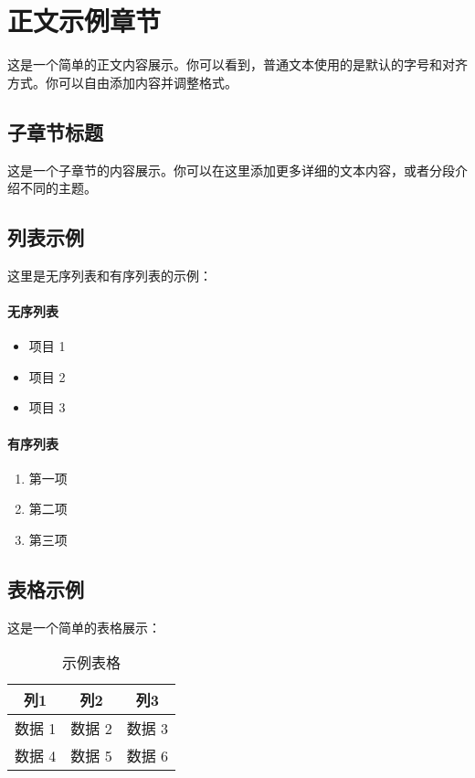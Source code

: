 \section{正文示例章节}

这是一个简单的正文内容展示。你可以看到，普通文本使用的是默认的字号和对齐方式。你可以自由添加内容并调整格式。

\subsection{子章节标题}

这是一个子章节的内容展示。你可以在这里添加更多详细的文本内容，或者分段介绍不同的主题。

\subsection{列表示例}

这里是无序列表和有序列表的示例：

\paragraph{无序列表}
\begin{itemize}
    \item 项目 1
    \item 项目 2
    \item 项目 3
\end{itemize}

\paragraph{有序列表}
\begin{enumerate}
    \item 第一项
    \item 第二项
    \item 第三项
\end{enumerate}

\subsection{表格示例}

这是一个简单的表格展示：

\begin{table}[htbp]
\centering
\caption{示例表格}
\begin{tabular}{|c|c|c|}
\hline
\textbf{列1} & \textbf{列2} & \textbf{列3} \\ \hline
数据 1      & 数据 2      & 数据 3      \\ \hline
数据 4      & 数据 5      & 数据 6      \\ \hline
\end{tabular}
\end{table}

\newpage